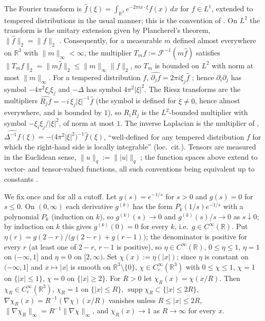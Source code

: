 \documentclass[11pt]{article}
\theoremstyle{definition}
\theoremstyle{plain}
\newcommand{\R}{\mathbb R}
\newcommand{\norm}[1]{\lVert #1\rVert}
\begin{document}
The Fourier transform is $\hat f(\xi)=\int_{\R^3}e^{-2\pi ix\cdot\xi}f(x)\,dx$
for $f\in L^1$, extended to tempered distributions in the usual manner; this
is the convention of \cite[p.~35]{Tao2013}.  On $L^2$ the transform is the
unitary extension given by Plancherel's theorem,
$\norm{\hat f}_2=\norm f_2$ \cite[Ch.~I, \S2]{SteinWeiss1971}.
Consequently, for a measurable $m$ defined almost everywhere on $\R^3$ with
$\norm m_\infty<\infty$, the multiplier $T_mf:=\mathcal F^{-1}(m\hat f)$
satisfies $\norm{T_mf}_2=\norm{m\hat f}_2\leq\norm m_\infty\norm f_2$, so
$T_m$ is bounded on $L^2$ with norm at most $\norm m_\infty$.  For a
tempered distribution $f$, $\widehat{\partial_jf}=2\pi i\xi_j\hat f$
\cite[Ch.~I, \S3]{SteinWeiss1971}; hence $\partial_i\partial_j$ has symbol
$-4\pi^2\xi_i\xi_j$ and $-\Delta$ has symbol $4\pi^2|\xi|^2$.  The Riesz
transforms are the multipliers $\widehat{R_jf}=-i\,\xi_j|\xi|^{-1}\hat f$
(the symbol is defined for $\xi\neq0$, hence almost everywhere, and is
bounded by $1$), so $R_iR_j$ is the $L^2$-bounded multiplier with symbol
$-\xi_i\xi_j/|\xi|^2$, of norm at most $1$.  The inverse Laplacian is the
multiplier of \cite[eq.~(14), p.~38]{Tao2013},
$\widehat{\Delta^{-1}f}(\xi)=-\bigl(4\pi^2|\xi|^2\bigr)^{-1}\hat f(\xi)$,
``well-defined for any tempered distribution $f$ for which the right-hand
side is locally integrable'' (loc.\ cit.).  Tensors are measured in the
Euclidean sense, $\norm u_q:=\norm{|u|}_q$ \cite[p.~35]{Tao2013}; the
function spaces above extend to vector- and tensor-valued functions, all
such conventions being equivalent up to constants \cite[p.~38]{Tao2013}.

We fix once and for all a cutoff.  Let $g(s)=e^{-1/s}$ for $s>0$ and
$g(s)=0$ for $s\leq0$.  On $(0,\infty)$ each derivative $g^{(k)}$ has the
form $P_k(1/s)e^{-1/s}$ with a polynomial $P_k$ (induction on $k$), so
$g^{(k)}(s)\to0$ and $g^{(k)}(s)/s\to0$ as $s\downarrow0$; by induction on
$k$ this gives $g^{(k)}(0)=0$ for every $k$, i.e.\ $g\in C^\infty(\R)$.  Put
$\eta(r)=g(2-r)/\bigl(g(2-r)+g(r-1)\bigr)$; the denominator is positive for
every $r$ (at least one of $2-r$, $r-1$ is positive), so
$\eta\in C^\infty(\R)$, $0\leq\eta\leq1$, $\eta=1$ on $(-\infty,1]$ and
$\eta=0$ on $[2,\infty)$.  Set $\chi(x):=\eta(|x|)$; since $\eta$ is
constant on $(-\infty,1]$ and $x\mapsto|x|$ is smooth on $\R^3\setminus\{0\}$,
$\chi\in C_c^\infty(\R^3)$ with $0\leq\chi\leq1$, $\chi=1$ on $\{|x|\leq1\}$,
$\chi=0$ on $\{|x|\geq2\}$.  For $R>0$ let $\chi_R(x)=\chi(x/R)$.  Then
$\chi_R\in C_c^\infty(\R^3)$, $\chi_R=1$ on $\{|x|\leq R\}$,
$\operatorname{supp}\chi_R\subset\{|x|\leq2R\}$,
$\nabla\chi_R(x)=R^{-1}(\nabla\chi)(x/R)$ vanishes unless $R\leq|x|\leq2R$,
$\norm{\nabla\chi_R}_\infty=R^{-1}\norm{\nabla\chi}_\infty$, and
$\chi_R(x)\to1$ as $R\to\infty$ for every $x$.
\end{document}
